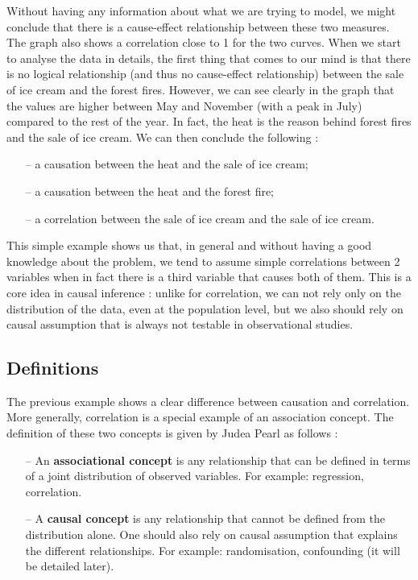 \documentclass{article}
\begin{document}
Without having any information about what we are trying to model, we might conclude that there is a cause-effect relationship between these two measures. The graph also shows a correlation close to 1 for the two curves. When we start to analyse the data in details, the first thing that comes to our mind is that there is no logical relationship (and thus no cause-effect relationship) between the sale of ice cream and the forest fires. However, we can see clearly in the graph that the values are higher between May and November (with a peak in July) compared to the rest of the year. In fact, the heat is the reason behind forest fires and the sale of ice cream. We can then conclude the following : 

\begin{itemize}
\item[--] a causation between the heat and the sale of ice cream;
\item[--] a causation between the heat and the forest fire;
\item[--] a correlation between the sale of ice cream and the sale of ice cream.
\end{itemize}

This simple example shows us that, in general and without having a good knowledge about the problem, we tend to assume simple correlations between 2 variables when in fact there is a third variable that causes both of them. This is a core idea in causal inference : unlike for correlation, we can not rely only on the distribution of the data, even at the population level, but we also should rely on causal assumption that is always not testable in observational studies.\cite{pearl2010mathematics} 

	\subsection{Definitions}
	
The previous example shows a clear difference between causation and correlation. More generally, correlation is a special example of an association concept. The definition of these two concepts is given by Judea Pearl\cite{pearl2010mathematics, pearl2009causal} as follows :

\begin{itemize}
\item[--] An \textbf{associational concept} is any relationship that can be defined in terms of a joint distribution of observed variables. For example: regression, correlation.
\item[--] A \textbf{causal concept} is any relationship that cannot be defined from the distribution alone. One should also rely on causal assumption that explains the different relationships. For example: randomisation, confounding (it will be detailed later).
\end{itemize}
\end{document}
